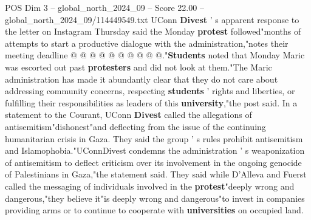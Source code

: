 \begin{textsample}{POS Dim 3 – global\_north\_2024\_09 – Score 22.00 – global\_north\_2024\_09/114449549.txt}
UConn \textbf{Divest} ' s apparent response to the letter on Instagram Thursday said the Monday \textbf{protest} followed"months of attempts to start a productive dialogue with the administration,"notes their meeting deadline @ @ @ @ @ @ @ @ @ @."\textbf{Students} noted that Monday Maric was escorted out past \textbf{protesters} and did not look at them."The Maric administration has made it abundantly clear that they do not care about addressing community concerns, respecting \textbf{students} ' rights and liberties, or fulfilling their responsibilities as leaders of this \textbf{university},"the post said.
In a statement to the Courant, UConn \textbf{Divest} called the allegations of antisemitism"dishonest"and deflecting from the issue of the continuing humanitarian crisis in Gaza.
They said the group ' s rules prohibit antisemitism and Islamophobia."UConnDivest condemns the administration ' s weaponization of antisemitism to deflect criticism over its involvement in the ongoing genocide of Palestinians in Gaza,"the statement said.
They said while D'Alleva and Fuerst called the messaging of individuals involved in the \textbf{protest}"deeply wrong and dangerous,"they believe it"is deeply wrong and dangerous"to invest in companies providing arms or to continue to cooperate with \textbf{universities} on occupied land.

\end{textsample}

